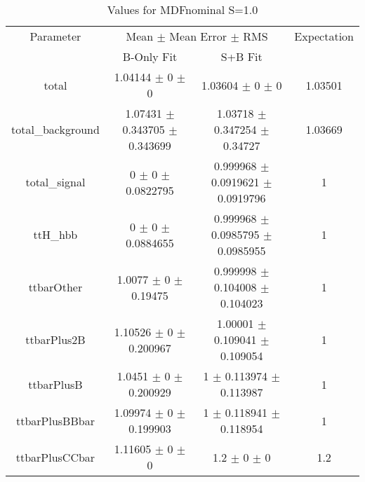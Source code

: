 \begin{table}
\centering
\caption{Values for MDFnominal S=1.0}
\begin{tabular}{cccc}
\toprule
Parameter & \multicolumn{2}{c}{Mean $\pm$ Mean Error $\pm$ RMS} & Expectation\\
 & B-Only Fit & S+B Fit & \\
\midrule
total & \num{1.04144} $\pm$ \num{0} $\pm$ \num{0} & \num{1.03604} $\pm$ \num{0} $\pm$ \num{0} & \num{1.03501}\\
total\_background & \num{1.07431} $\pm$ \num{0.343705} $\pm$ \num{0.343699} & \num{1.03718} $\pm$ \num{0.347254} $\pm$ \num{0.34727} & \num{1.03669}\\
total\_signal & \num{0} $\pm$ \num{0} $\pm$ \num{0.0822795} & \num{0.999968} $\pm$ \num{0.0919621} $\pm$ \num{0.0919796} & \num{1}\\
ttH\_hbb & \num{0} $\pm$ \num{0} $\pm$ \num{0.0884655} & \num{0.999968} $\pm$ \num{0.0985795} $\pm$ \num{0.0985955} & \num{1}\\
ttbarOther & \num{1.0077} $\pm$ \num{0} $\pm$ \num{0.19475} & \num{0.999998} $\pm$ \num{0.104008} $\pm$ \num{0.104023} & \num{1}\\
ttbarPlus2B & \num{1.10526} $\pm$ \num{0} $\pm$ \num{0.200967} & \num{1.00001} $\pm$ \num{0.109041} $\pm$ \num{0.109054} & \num{1}\\
ttbarPlusB & \num{1.0451} $\pm$ \num{0} $\pm$ \num{0.200929} & \num{1} $\pm$ \num{0.113974} $\pm$ \num{0.113987} & \num{1}\\
ttbarPlusBBbar & \num{1.09974} $\pm$ \num{0} $\pm$ \num{0.199903} & \num{1} $\pm$ \num{0.118941} $\pm$ \num{0.118954} & \num{1}\\
ttbarPlusCCbar & \num{1.11605} $\pm$ \num{0} $\pm$ \num{0} & \num{1.2} $\pm$ \num{0} $\pm$ \num{0} & \num{1.2}\\
\bottomrule
\end{tabular}
\end{table}